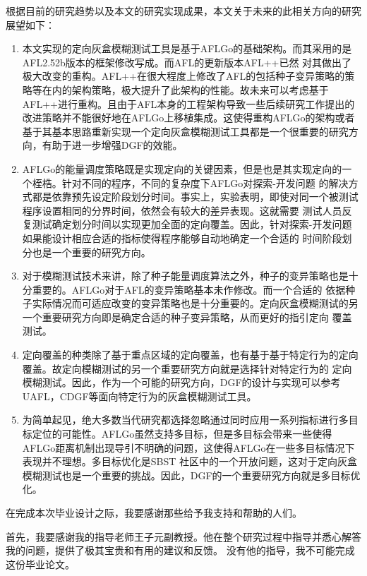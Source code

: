 \documentclass[bachelor]{njupthesis}
\begin{document}
根据目前的研究趋势以及本文的研究实现成果，本文关于未来的此相关方向的研究展望如下：
\begin{enumerate}[label=(\arabic*),leftmargin=48pt]
	\item 本文实现的定向灰盒模糊测试工具是基于AFLGo的基础架构。而其采用的是AFL2.52b版本的框架修改写成。而AFL的更新版本AFL++已然
	对其做出了极大改变的重构。AFL++在很大程度上修改了AFL的包括种子变异策略的策略等在内的架构策略，极大提升了此架构的性能。故未来可以考虑基于
	AFL++进行重构。且由于AFL本身的工程架构导致一些后续研究工作提出的改进策略并不能很好地在AFLGo上移植集成。这使得重构AFLGo的架构或者
	基于其基本思路重新实现一个定向灰盒模糊测试工具都是一个很重要的研究方向，有助于进一步增强DGF的效能。
	\item AFLGo的能量调度策略既是实现定向的关键因素，但是也是其实现定向的一个桎梏。针对不同的程序，不同的复杂度下AFLGo对探索-开发问题
	的解决方式都是依靠预先设定阶段划分时间。事实上，实验表明，即使对同一个被测试程序设置相同的分界时间，依然会有较大的差异表现。这就需要
	测试人员反复测试确定划分时间以实现更加全面的定向覆盖。因此，针对探索-开发问题如果能设计相应合适的指标使得程序能够自动地确定一个合适的
	时间阶段划分也是一个重要的研究方向。
	\item 对于模糊测试技术来讲，除了种子能量调度算法之外，种子的变异策略也是十分重要的。AFLGo对于AFL的变异策略基本未作修改。而一个合适的
	依据种子实际情况而可适应改变的变异策略也是十分重要的。定向灰盒模糊测试的另一个重要研究方向即是确定合适的种子变异策略，从而更好的指引定向
	覆盖测试。
	\item 定向覆盖的种类除了基于重点区域的定向覆盖，也有基于基于特定行为的定向覆盖。故定向模糊测试的另一个重要研究方向就是选择针对特定行为的
	定向模糊测试。因此，作为一个可能的研究方向，DGF的设计与实现可以参考UAFL，CDGF等面向特定行为的灰盒模糊测试工具。
	\item 为简单起见，绝大多数当代研究都选择忽略通过同时应用一系列指标进行多目标定位的可能性。AFLGo虽然支持多目标，但是多目标会带来一些使得
	AFLGo距离机制出现导引不明确的问题，这使得AFLGo在一些多目标情况下表现并不理想。多目标优化是SBST 社区中的一个开放问题，这对于定向灰盒
	模糊测试也是一个重要的挑战。因此，DGF的一个重要研究方向就是多目标优化。
\end{enumerate}

\thesisacknowledgement
在完成本次毕业设计之际，我要感谢那些给予我支持和帮助的人们。

首先，我要感谢我的指导老师王子元副教授。他在整个研究过程中指导并悉心解答我的问题，提供了极其宝贵和有用的建议和反馈。
没有他的指导，我不可能完成这份毕业论文。
\end{document}
